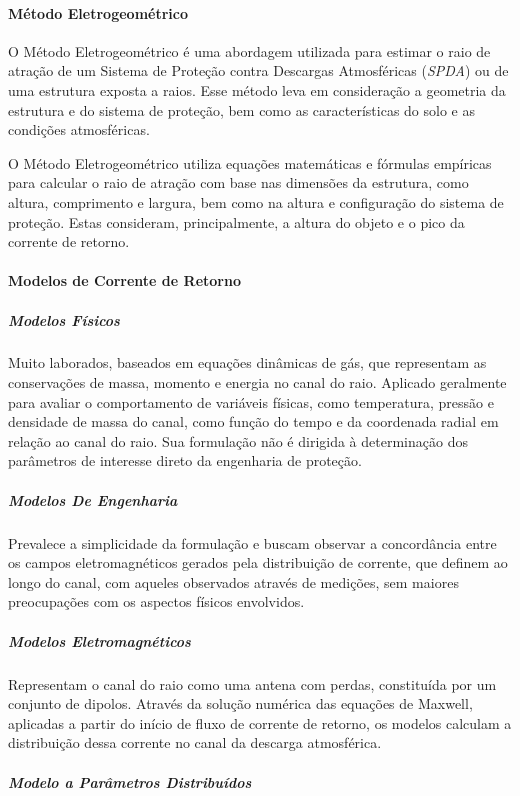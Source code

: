 \documentclass[a4paper, 12pt, onecolumn,singlespacing]{article}
\begin{document}
		\paragraph{Método Eletrogeométrico}
		
		O Método Eletrogeométrico é uma abordagem utilizada para estimar o raio de atração de um Sistema de Proteção contra Descargas Atmosféricas (\textit{SPDA}) ou de uma estrutura exposta a raios. Esse método leva em consideração a geometria da estrutura e do sistema de proteção, bem como as características do solo e as condições atmosféricas.
		
		O Método Eletrogeométrico utiliza equações matemáticas e fórmulas empíricas para calcular o raio de atração com base nas dimensões da estrutura, como altura, comprimento e largura, bem como na altura e configuração do sistema de proteção. Estas consideram, principalmente, a altura do objeto e o pico da corrente de retorno.
		
		\paragraph{Modelos de Corrente de Retorno}
		
		\subparagraph{Modelos Físicos} Muito laborados, baseados em equações dinâmicas de gás, que representam as conservações de massa, momento e energia no canal do raio. Aplicado geralmente para avaliar o comportamento de variáveis físicas, como temperatura, pressão e densidade de massa do canal, como função do tempo e da coordenada radial em relação ao canal do raio. Sua formulação não é dirigida à	determinação dos parâmetros de interesse direto da engenharia de proteção.
		
		\subparagraph{Modelos De Engenharia}
		
		Prevalece a simplicidade da formulação e buscam observar a concordância entre os campos
		eletromagnéticos gerados pela distribuição de corrente, que definem ao longo do canal, com aqueles observados através	de medições, sem maiores preocupações com os aspectos físicos envolvidos.
		
		\subparagraph{Modelos Eletromagnéticos}
		
		Representam o canal do raio como uma antena com perdas, constituída por um conjunto de
		dipolos. Através da solução numérica das equações de Maxwell, aplicadas a partir do início de fluxo de corrente de retorno, os modelos calculam a distribuição dessa corrente no canal da descarga atmosférica.
		
		\subparagraph{Modelo a Parâmetros Distribuídos}
		
\end{document}
